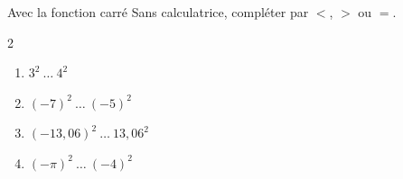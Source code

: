 \begin{exo}{Avec la fonction carré}
	Sans calculatrice, compléter par $<$, $>$ ou $=$.
	\vspace*{-2mm}
	\begin{multicols}{2}
		\begin{enumerate}[itemsep=2mm]
			\item $3^2 \ \dots \ 4^2$
			\item $(-7)^2 \ \dots \ (-5)^2$
			\item $(-13,06)^2 \ \dots \ 13,06^2$
			\item $(-\pi)^2 \ \dots \ (-4)^2$
		\end{enumerate}
	\end{multicols}\vspace*{-2mm}
\end{exo}
